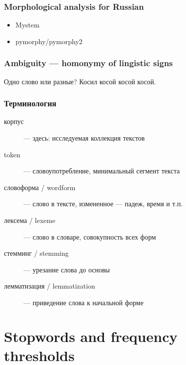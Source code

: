 \documentclass[svgnames]{beamer}
\begin{document}
\begin{frame}
  \frametitle{Morphological analysis for Russian}
  \begin{itemize}
  \item Mystem
  \item pymorphy/pymorphy2
  \end{itemize}
\end{frame}

\begin{frame}
  \frametitle{Ambiguity — homonymy of lingistic signs}
  \LARGE
  \begin{block}{Одно слово или разные?}
    Косил \alert<1>{косой косой косой}.
  \end{block}
\end{frame}


\begin{frame}
  \frametitle{Терминология}
  \begin{description}
  \item[корпус] — здесь: исследуемая коллекция текстов
  \item[token] — словоупотребление, минимальный сегмент текста
  \item[словоформа / wordform] — слово в тексте, измененное — падеж, время и т.п.
  \item[лексема / lexeme] — слово в словаре, совокупность всех форм
  \item[стемминг / stemming] — урезание слова до основы
  \item[лемматизация / lemmatization] — приведение слова к начальной форме
  \end{description}
\end{frame}

\section{Stopwords and frequency thresholds}
\end{document}
